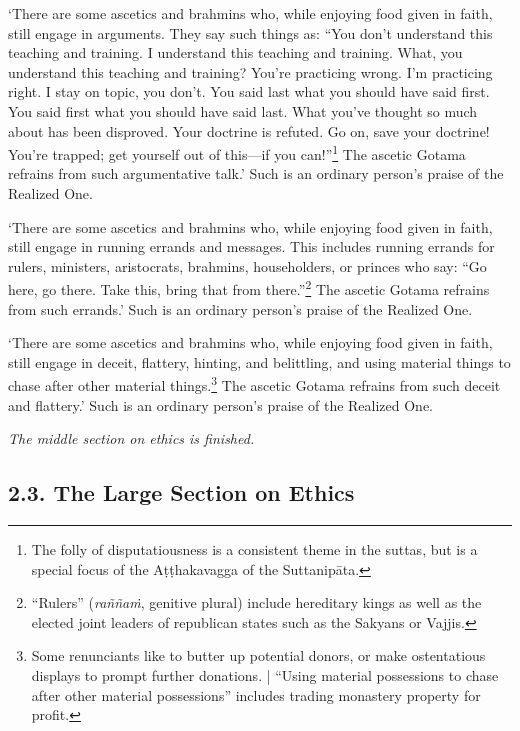 \documentclass[12pt,openany]{book}%
\newcommand*{\scendsection}[1]{\begin{Center}\begin{small}\textit{#1}\end{small}\end{Center}\addvspace{1em}}
\begin{document}
‘There are some ascetics and brahmins who, while enjoying food given in faith, still engage in arguments. They say such things as: “You don’t understand this teaching and training. I understand this teaching and training. What, you understand this teaching and training? You’re practicing wrong. I’m practicing right. I stay on topic, you don’t. You said last what you should have said first. You said first what you should have said last. What you’ve thought so much about has been disproved. Your doctrine is refuted. Go on, save your doctrine! You’re trapped; get yourself out of this—if you can!”\footnote{The folly of disputatiousness is a consistent theme in the suttas, but is a special focus of the \textsanskrit{Aṭṭhakavagga} of the \textsanskrit{Suttanipāta}. } The ascetic Gotama refrains from such argumentative talk.’ Such is an ordinary person’s praise of the Realized One. 

‘There are some ascetics and brahmins who, while enjoying food given in faith, still engage in running errands and messages. This includes running errands for rulers, ministers, aristocrats, brahmins, householders, or princes who say: “Go here, go there. Take this, bring that from there.”\footnote{“Rulers” (\textit{\textsanskrit{raññaṁ}}, genitive plural) include hereditary kings as well as the elected joint leaders of republican states such as the Sakyans or Vajjis. } The ascetic Gotama refrains from such errands.’ Such is an ordinary person’s praise of the Realized One. 

‘There are some ascetics and brahmins who, while enjoying food given in faith, still engage in deceit, flattery, hinting, and belittling, and using material things to chase after other material things.\footnote{Some renunciants like to butter up potential donors, or make ostentatious displays to prompt further donations. | “Using material possessions to chase after other material possessions” includes trading monastery property for profit. } The ascetic Gotama refrains from such deceit and flattery.’ Such is an ordinary person’s praise of the Realized One. 

\scendsection{The middle section on ethics is finished. }

\subsection*{2.3. The Large Section on Ethics }
\end{document}
